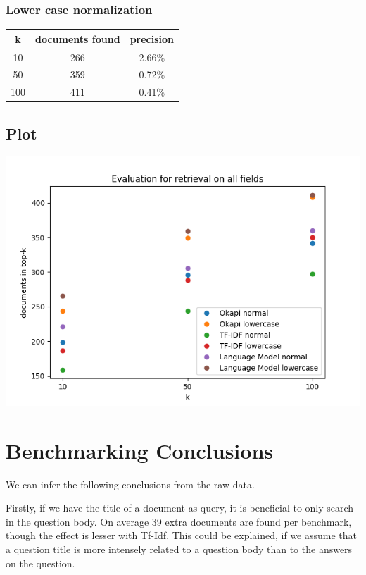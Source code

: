 \documentclass{article}
\begin{document}
\subsubsection{Lower case normalization}
\begin{center}
\begin{tabular}{|c|c|c|} \hline
\textbf{k} & \textbf{documents found} & \textbf{precision}\\ \hline
10 & 266 & 2.66\%\\
50 & 359 & 0.72\%\\
100 & 411 & 0.41\%\\ \hline
\end{tabular}
\end{center}

\subsection{Plot}

\includegraphics[width=\textwidth]{all_fields}

\section{Benchmarking Conclusions}
We can infer the following conclusions from the raw data. 

Firstly, if we have the title of a document as query, it is beneficial to only search in the question body. On average 39 extra documents are found per benchmark, though the effect is lesser with Tf-Idf. This could be explained, if we assume that a question title is more intensely related to a question body than to the answers on the question.\\
\end{document}
